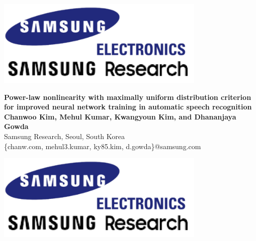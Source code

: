 \documentclass[a0,portrait]{a0poster}
\begin{document}


\begin{minipage}[t]{1.0\linewidth}
\begin{center}
  \begin{minipage}[t]{0.1\textwidth}
    \centering
    \vspace{0pt}
    \includegraphics[width=10cm, valign=t]{samsung_research} %
  \end{minipage} \hfill
  \begin{minipage}[t]{0.7\textwidth}
    \begin{center}
  \huge \color{NavyBlue} 
      \textbf{Power-law nonlinearity with maximally uniform distribution criterion for
      improved neural network training in automatic speech recognition} \\
      \LARGE \textbf{Chanwoo Kim, Mehul Kumar, Kwangyoun Kim, and Dhananjaya Gowda}
  \\
\LARGE Samsung Research, Seoul, South Korea\\ %
\large \{chanw.com, mehul3.kumar, ky85.kim, d.gowda\}@samsung.com
    \end{center}
  \end{minipage}
  \begin{minipage}[t]{0.1\textwidth}
    \begin{center}
    \includegraphics[width=10cm]{samsung_research} %
    \end{center}
  \end{minipage} \hfill
\end{center}
\end{minipage}
\end{document}
